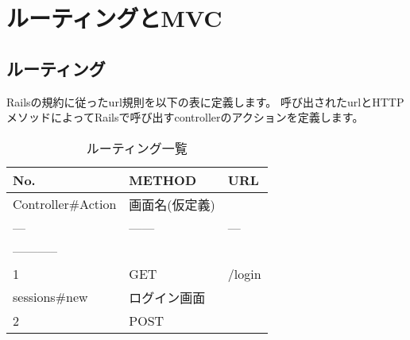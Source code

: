 \section{ルーティングとMVC}
\subsection{ルーティング}
Railsの規約に従ったurl規則を以下の表に定義します。
呼び出されたurlとHTTPメソッドによってRailsで呼び出すcontrollerのアクションを定義します。

\begin{table}[]
\centering
\caption{ルーティング一覧}
\label{my-label}
\begin{tabular}{lll}
\hline
\multicolumn{1}{|l|}{No.}                          & \multicolumn{1}{l|}{METHOD} & \multicolumn{1}{l|}{URL}                                                                                                                                    \\ \hline
\multicolumn{1}{|l|}{Controller\#Action}           & 画面名(仮定義)                    &                                                                                                                                                             \\ \cline{1-1}
---                                                & ------                      & ---                                                                                                                                                         \\
-----------                                        &                             &                                                                                                                                                             \\ \hline
\multicolumn{1}{|l|}{1}                            & \multicolumn{1}{l|}{GET}    & \multicolumn{1}{l|}{/login}                                                                                                                                 \\ \hline
\multicolumn{1}{|l|}{sessions\#new}                & ログイン画面                      &                                                                                                                                                             \\ \cline{1-2}
\multicolumn{1}{|l|}{2}                            & \multicolumn{1}{l|}{POST}   &                                                                                                                                                             \\ \cline{1-2}

\end{tabular}
\end{table}
